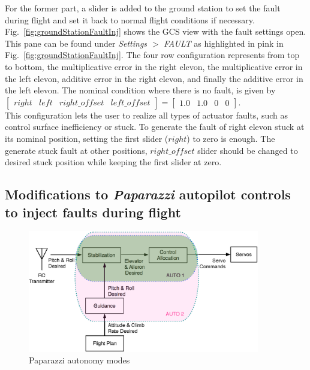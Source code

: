For the former part, a slider is added to the ground station to set the fault during flight and set it back to normal flight conditions if necessary. 
Fig.~\ref{fig:groundStationFaultInj} shows the GCS view with the fault settings open. 
This pane can be found under  \emph{Settings} $>$  \emph{FAULT} as highlighted in pink in Fig.~\ref{fig:groundStationFaultInj}. 
The four row configuration represents from top to bottom, the multiplicative error in the right elevon, the multiplicative error in the left elevon, additive error in the right elevon, and finally the additive error in the left elevon. 
The nominal condition where there is no fault, is given by $[\begin{matrix}right & left & right\_offset &left\_offset\end{matrix}] = [\begin{matrix} 1.0 & 1.0 & 0 & 0\end{matrix}]$. \\
This configuration lets the user to realize all types of actuator faults, such as control surface inefficiency or stuck. 
To generate the fault of right elevon stuck at its nominal position, setting the first slider ($right$) to zero is enough. 
The generate stuck fault at other positions, $right\_offset$ slider should be changed to desired stuck position while keeping the first slider at zero. 

\subsection{Modifications to \emph{Paparazzi} autopilot controls to inject faults during flight}

\begin{figure}
\begin{center}
\includegraphics[width=0.9\textwidth]{figures/pprzControlModes}    %
\caption{Paparazzi autonomy modes} 
\label{fig:paparazziControlModes}
\end{center}
\end{figure}


